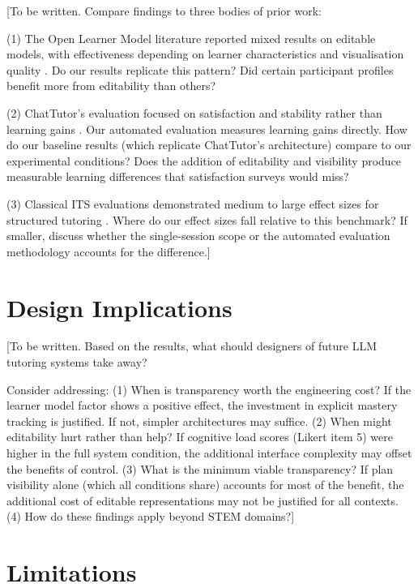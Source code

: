 \documentclass[logo,bsc,singlespacing,parskip,online]{infthesis}
\begin{document}
[To be written. Compare findings to three bodies of prior work:

(1) The Open Learner Model literature reported mixed results on editable models, with effectiveness depending on learner characteristics and visualisation quality \citep{hooshyar2020olm}. Do our results replicate this pattern? Did certain participant profiles benefit more from editability than others?

(2) ChatTutor's evaluation focused on satisfaction and stability rather than learning gains \citep{chen2024chattutor}. Our automated evaluation measures learning gains directly. How do our baseline results (which replicate ChatTutor's architecture) compare to our experimental conditions? Does the addition of editability and visibility produce measurable learning differences that satisfaction surveys would miss?

(3) Classical ITS evaluations demonstrated medium to large effect sizes for structured tutoring \citep{kulik2016itsmeta}. Where do our effect sizes fall relative to this benchmark? If smaller, discuss whether the single-session scope or the automated evaluation methodology accounts for the difference.]

\section{Design Implications}

[To be written. Based on the results, what should designers of future LLM tutoring systems take away?

Consider addressing: (1) When is transparency worth the engineering cost? If the learner model factor shows a positive effect, the investment in explicit mastery tracking is justified. If not, simpler architectures may suffice. (2) When might editability hurt rather than help? If cognitive load scores (Likert item 5) were higher in the full system condition, the additional interface complexity may offset the benefits of control. (3) What is the minimum viable transparency? If plan visibility alone (which all conditions share) accounts for most of the benefit, the additional cost of editable representations may not be justified for all contexts. (4) How do these findings apply beyond STEM domains?]

\section{Limitations}
\label{sec:limitations}
\end{document}
